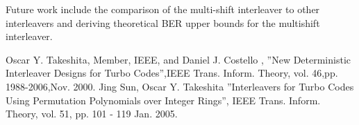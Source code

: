 \documentclass[twoside]{jarticle}
\begin{document}
Future work include the comparison of the multi-shift interleaver to other interleavers and deriving theoretical BER upper bounds for the multishift interleaver.
\vspace{-4mm}
\begin{thebibliography}{9}
Oscar Y. Takeshita, Member, IEEE, and Daniel J. Costello ,
''New Deterministic Interleaver Designs for Turbo Codes'',IEEE Trans. Inform. 
Theory, vol.  46,pp. 1988-2006,Nov. 2000.
 Jing Sun, Oscar Y. Takeshita ''Interleavers for Turbo Codes Using 
Permutation Polynomials over Integer Rings'', IEEE Trans. Inform. Theory, vol. 51, 
pp. 101 - 119  Jan. 2005.
\end{thebibliography}
\end{document}
